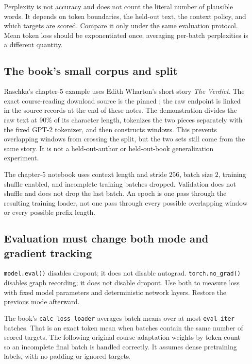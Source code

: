 Perplexity is not accuracy and does not count the literal number of plausible
words. It depends on token boundaries, the held-out text, the context policy,
and which targets are scored. Compare it only under the same evaluation
protocol. Mean token loss should be exponentiated once; averaging per-batch
perplexities is a different quantity.

\subsection{The book's small corpus and split}
Raschka's chapter-5 example uses Edith Wharton's short story \emph{The Verdict}.
The exact course-reading download source is the pinned
;
the raw endpoint is linked in the source records at the end of these notes.
The demonstration divides the raw text at 90\% of its character length,
tokenizes the two pieces separately with the fixed GPT-2 tokenizer, and then
constructs windows. This prevents overlapping windows from crossing the split,
but the two sets still come from the same story. It is not a held-out-author
or held-out-book generalization experiment.

The chapter-5 notebook uses context length and stride $256$, batch size $2$,
training shuffle enabled, and incomplete training batches dropped. Validation
does not shuffle and does not drop the last batch. An epoch is one pass through
the resulting training loader, not one pass through every possible overlapping
window or every possible prefix length.

\subsection{Evaluation must change both mode and gradient tracking}
\texttt{model.eval()} disables dropout; it does not disable autograd.
\texttt{torch.no\_grad()} disables graph recording; it does not disable dropout.
Use both to measure loss with fixed model parameters and deterministic network
layers. Restore the previous mode afterward.

The book's \texttt{calc\_loss\_loader} averages batch means over at most
\texttt{eval\_iter} batches. That is an exact token mean when batches contain
the same number of scored targets. The following original course adaptation
weights by token count so an incomplete final batch is handled correctly.
It assumes dense pretraining labels, with no padding or ignored targets.

